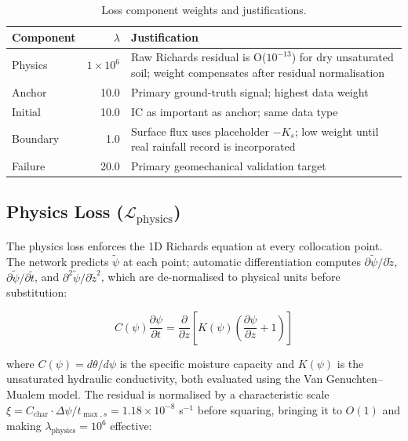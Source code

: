 \documentclass[12pt]{report}
\begin{document}
\begin{table}[htbp]
\centering
\begin{tabular}{lrp{7cm}}
\hline
\textbf{Component} & \textbf{$\lambda$} & \textbf{Justification} \\
\hline
Physics  & $1 \times 10^6$ & Raw Richards residual is O($10^{-13}$)
                              for dry unsaturated soil; weight
                              compensates after residual normalisation \\
Anchor   & 10.0 & Primary ground-truth signal; highest data weight \\
Initial  & 10.0 & IC as important as anchor; same data type \\
Boundary & 1.0  & Surface flux uses placeholder $-K_s$; low weight
                  until real rainfall record is incorporated \\
Failure  & 20.0 & Primary geomechanical validation target \\
\hline
\end{tabular}
\caption{Loss component weights and justifications.}
\label{tab:loss_weights}
\end{table}

\subsection{Physics Loss ($\mathcal{L}_{\text{physics}}$)}

The physics loss enforces the 1D Richards equation at every
collocation point. The network predicts $\tilde{\psi}$ at each point;
automatic differentiation computes
$\partial\tilde{\psi}/\partial\tilde{z}$,
$\partial\tilde{\psi}/\partial\tilde{t}$, and
$\partial^2\tilde{\psi}/\partial\tilde{z}^2$,
which are de-normalised to physical units before substitution:

\begin{equation}
C(\psi)\frac{\partial \psi}{\partial t} =
\frac{\partial}{\partial z}\left[K(\psi)
\left(\frac{\partial \psi}{\partial z} + 1\right)\right]
\end{equation}

where $C(\psi) = d\theta/d\psi$ is the specific moisture capacity and
$K(\psi)$ is the unsaturated hydraulic conductivity, both evaluated
using the Van Genuchten--Mualem model. The residual is normalised by
a characteristic scale $\xi = C_{\text{char}} \cdot \Delta\psi /
t_{\max,s} = 1.18 \times 10^{-8}$ s$^{-1}$ before squaring, bringing
it to $O(1)$ and making $\lambda_{\text{physics}} = 10^6$ effective:
\end{document}
